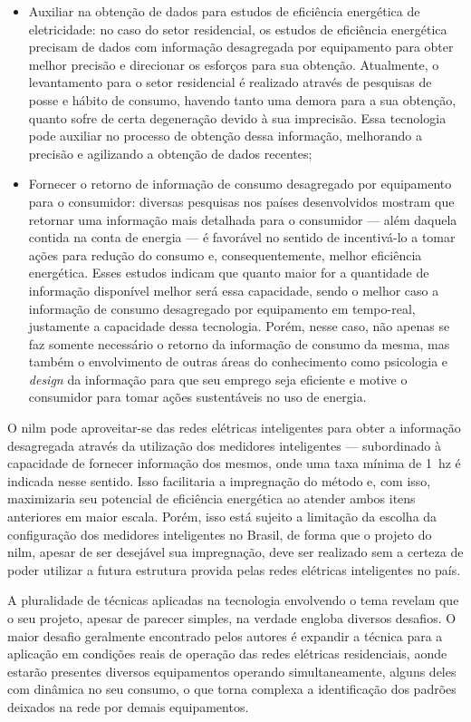 \begin{itemize}
\item Auxiliar na obtenção de dados para estudos de eficiência
energética de eletricidade: no caso do setor residencial, os estudos
de eficiência energética precisam de dados com informação desagregada
por equipamento para obter melhor precisão e direcionar os esforços para
sua obtenção. Atualmente, o levantamento para o setor residencial é
realizado através de pesquisas de posse e hábito de consumo, havendo
tanto uma demora para a sua obtenção, quanto sofre de certa degeneração
devido à sua imprecisão. Essa tecnologia pode auxiliar no processo de
obtenção dessa informação, melhorando a precisão e agilizando a
obtenção de dados recentes;
\item Fornecer o retorno de informação de consumo desagregado por
equipamento para o consumidor: diversas pesquisas nos países
desenvolvidos mostram que retornar uma informação mais detalhada para
o consumidor --- além daquela contida na conta de energia --- é favorável
no sentido de incentivá-lo a tomar ações para redução do consumo e,
consequentemente, melhor eficiência energética. Esses
estudos indicam que quanto maior for a quantidade de informação
disponível melhor será essa capacidade, sendo o melhor caso a
informação de consumo desagregado por equipamento em tempo-real,
justamente a capacidade dessa tecnologia. Porém, nesse caso, não apenas se
faz somente necessário o retorno da informação de consumo da mesma,
mas também o envolvimento de outras áreas do conhecimento como
psicologia e \emph{design} da informação para que seu emprego seja
eficiente e motive o consumidor para tomar ações sustentáveis no uso
de energia.
\end{itemize}

O \acs{nilm} pode aproveitar-se das redes elétricas inteligentes para
obter a informação desagregada através da utilização dos medidores
inteligentes --- subordinado à capacidade de fornecer informação dos
mesmos, onde uma taxa mínima de 1~\acs{hz} é indicada nesse sentido.
Isso facilitaria a impregnação do método e, com isso, maximizaria seu
potencial de eficiência energética ao atender ambos itens anteriores
em maior escala. Porém, isso está sujeito a limitação
da escolha da configuração dos medidores inteligentes no Brasil, de
forma que o projeto do \acs{nilm}, apesar de ser desejável sua
impregnação, deve ser realizado sem a certeza de poder utilizar a
futura estrutura provida pelas redes elétricas inteligentes no país.

A pluralidade de técnicas aplicadas na tecnologia envolvendo o tema
revelam que o seu projeto, apesar de parecer simples, na verdade
engloba diversos desafios. O maior desafio geralmente encontrado pelos
autores é expandir a técnica para a aplicação em condições reais de
operação das redes elétricas residenciais, aonde estarão presentes
diversos equipamentos operando simultaneamente, alguns deles com dinâmica
no seu consumo, o que torna complexa a identificação dos padrões
deixados na rede por demais equipamentos.

